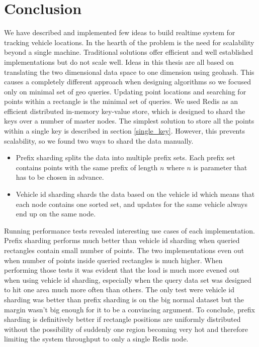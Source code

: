 \documentclass[times, utf8, diplomski]{fer}
\begin{document}
\chapter{Conclusion}
We have described and implemented few ideas to build realtime system for tracking vehicle locations. In the hearth of the problem is the need for scalability beyond a single machine. Traditional solutions offer efficient and well established implementations but do not scale well. Ideas in this thesis are all based on translating the two dimensional data space to one dimension using geohash. This causes a completely different approach when designing algorithms so we focused only on minimal set of geo queries. Updating point locations and searching for points within a rectangle is the minimal set of queries. We used Redis as an efficient distributed in-memory key-value store, which is designed to shard the keys over a number of master nodes. The simplest solution to store all the points within a single key is described in section \ref{single_key}. However, this prevents scalability, so we found two ways to shard the data manually.

\begin{itemize}
\item Prefix sharding splits the data into multiple prefix sets. Each prefix set contains points with the same prefix of length $n$ where $n$ is parameter that has to be chosen in advance.

\item Vehicle id sharding shards the data based on the vehicle id which means that each node contains one sorted set, and updates for the same vehicle always end up on the same node.
\end{itemize}

Running performance tests revealed interesting use cases of each implementation. Prefix sharding performs much better than vehicle id sharding when queried rectangles contain small number of points. The two implementations even out when number of points inside queried rectangles is much higher. When performing those tests it was evident that the load is much more evened out when using vehicle id sharding, especially when the query data set was designed to hit one area much more often than others. The only test were vehicle id sharding was better than prefix sharding is on the big normal dataset but the margin wasn't big enough for it to be a convincing argument. To conclude, prefix sharding is definitively better if rectangle positions are uniformly distributed without the possibility of suddenly one region becoming very hot and therefore limiting the system throughput to only a single Redis node.
\end{document}
